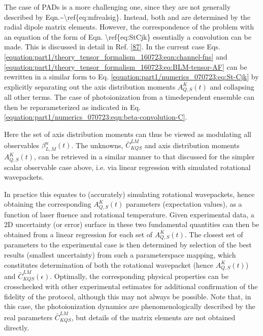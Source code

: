 \documentclass[letterpaper,table,10pt,english]{jupyterBook}
\begin{document}
\sphinxAtStartPar
The case of PADs is a more challenging one, since they are not generally described by Eqn.\textasciitilde{}\textbackslash{}ref\{eq:mfrealsig\}. Instead, both {\hyperref[\detokenize{backmatter/glossary:term-AF}]{}} and {\hyperref[\detokenize{backmatter/glossary:term-MF}]{}} {\hyperref[\detokenize{backmatter/glossary:term-PADs}]{}} are determined by the radial dipole matrix elements. However, the correspondence of the problem with an equation of the form of Eqn. \textbackslash{}ref\{eq:St\sphinxhyphen{}Cjk\} \sphinxhyphen{} essentially a convolution \sphinxhyphen{} can be made. This is discussed in detail in Ref. {[}\hyperlink{cite.backmatter/bibliography:id916}{87}{]}. In the current case Eqs. \eqref{equation:part1/theory_tensor_formalism_160723:eqn:channel-fns} and \eqref{equation:part1/theory_tensor_formalism_160723:eq:BLM-tensor-AF} can be rewritten in a similar form to Eq. \eqref{equation:part1/numerics_070723:eq:St-Cjk} by explicitly separating out the axis distribution moments \(A_{Q,S}^{K}(t)\) and collapsing all other terms. The case of photoionization from a time\sphinxhyphen{}dependent ensemble can then be reparameterized as indicated in Eq. \eqref{equation:part1/numerics_070723:eqn:beta-convolution-C}.

\sphinxAtStartPar
Here the set of axis distribution moments can thus be viewed as modulating all observables \(\beta_{L,M}^{u}(t)\). The unknowns, \(\bar{C}_{KQS}^{LM}\) and axis distribution moments \(A_{Q,S}^{K}(t)\), can be retrieved in a similar manner to that discussed for the simpler scalar observable case above, i.e. via linear regression with simulated rotational wavepackets.

\sphinxAtStartPar
In practice this equates to (accurately) simulating rotational wavepackets, hence obtaining the corresponding \(A_{Q,S}^{K}(t)\) parameters (expectation values), as a function of laser fluence and rotational temperature. Given experimental data, a 2D uncertainty (or error) surface in these two fundamental quantities can then be obtained from a linear regression for each set of \(A_{Q,S}^{K}(t)\). The closest set of parameters to the experimental case is then determined by selection of the best results (smallest uncertainty) from such a parameter\sphinxhyphen{}space mapping, which constitutes determination of both the rotational wavepacket (hence \(A_{Q,S}^{K}(t)\)) and \(\bar{C}_{KQS}^{LM}(\epsilon)\). Optimally, the corresponding physical properties can be cross\sphinxhyphen{}checked with other experimental estimates for additional confirmation of the fidelity of the protocol, although this may not always be possible. Note that, in this case, the photoionization dynamics are phenomenologically described by the real parameters \(\bar{C}_{KQS}^{LM}\), but details of the matrix elements are not obtained directly.
\end{document}
